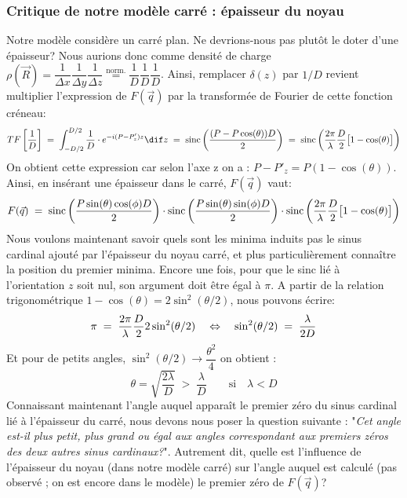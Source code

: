     \subsubsection{Critique de notre modèle carré : épaisseur du noyau}


Notre modèle considère un carré plan. Ne devrions-nous pas plutôt le doter d'une épaisseur? Nous aurions donc comme densité de charge $\rho(\vec{R}) = \dfrac{1}{\Delta x}\dfrac{1}{\Delta y} \dfrac{1}{\Delta z} \overset{\text{norm.}}= \dfrac{1}{D}\dfrac{1}{D} \dfrac{1}{D}$. Ainsi, remplacer $\delta(z)$ par $1/D$ revient multiplier l'expression de $F(\vec{q})$ par la transformée de Fourier de cette fonction créneau:
\[
    TF\left[ \dfrac{1}{D} \right] \eq
    \int_{-D/2}^{D/2}\dfrac{1}{D} \cdot e^{-i(P-P'_z)z} \dif z
    \eq
    \sinc\left(\dfrac{(P - P \cos(\theta))D}{2}\right)
    \eq
    \sinc\left(\dfrac{2\pi}{\lambda} \dfrac{D}{2} 
    \big[ 1-\cos(\theta) \big]\right)
\]
On obtient cette expression car selon l'axe z on a : $P - P'_z = P\left(1 - \cos(\theta) \right)$. Ainsi, en insérant une épaisseur dans le carré, $F(\vec{q})$ vaut:
\[
    F(\vec{q}) \; = \; 
    \operatorname{sinc}\left(\dfrac{P \sin(\theta)\cos(\phi)D}{2}\right) \cdot
    \operatorname{sinc}\left(\dfrac{P \sin(\theta)\sin(\phi)D}{2}\right) \cdot
    \operatorname{sinc}\left(\dfrac{2\pi}{\lambda} \dfrac{D}{2} 
    \big[ 1-\cos(\theta) \big]\right)
\]
Nous voulons maintenant savoir quels sont les minima induits pas le sinus cardinal ajouté par l'épaisseur du noyau carré, et plus particulièrement connaître la position du premier minima. Encore une fois, pour que le sinc lié à l'orientation $z$ soit nul, son argument doit être égal à $\pi$.
A partir de la relation trigonométrique $1-\cos(\theta) = 2\sin^2(\theta /2)$, nous pouvons écrire:
\[
    \pi \; = \;
    \dfrac{2\pi}{\lambda} \dfrac{D}{2}
    2 \sin^2(\theta /2)
    \quad \Leftrightarrow \quad
    \sin^2(\theta /2) \; = \; \dfrac{\lambda}{2D}
\]
Et pour de petits angles, $\sin^2(\theta /2) \rightarrow \dfrac{\theta^2}{4}$ on obtient :
\[
    \theta = \sqrt{\dfrac{2\lambda}{D}} \; > \; \dfrac{\lambda}{D}
    \qquad \text{si} \quad \lambda < D
\]
Connaissant maintenant l'angle auquel apparaît le premier zéro du sinus cardinal lié à l'épaisseur du carré, nous devons nous poser la question suivante : "\textit{Cet angle est-il plus petit, plus grand ou égal aux angles correspondant aux premiers zéros des deux autres sinus cardinaux?}". Autrement dit, quelle est l'influence de l'épaisseur du noyau (dans notre modèle carré) sur l'angle auquel est calculé (pas observé ; on est encore dans le modèle) le premier zéro de $F(\vec{q})$?\\

